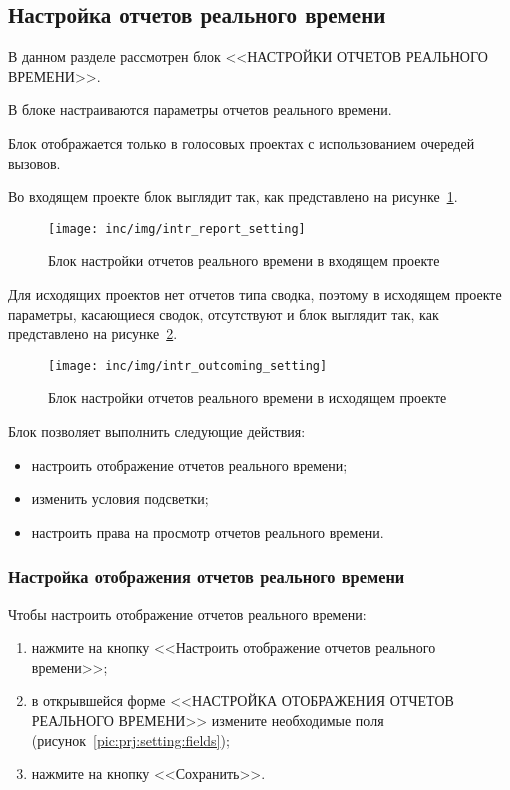 \subsection{Настройка отчетов реального времени}\label{subsec:настройка-отчетов-реального-времени}

В данном разделе рассмотрен блок <<НАСТРОЙКИ ОТЧЕТОВ РЕАЛЬНОГО ВРЕМЕНИ>>.

В блоке настраиваются параметры отчетов реального времени.

Блок отображается только в голосовых проектах с использованием очередей вызовов.

Во входящем проекте блок выглядит так, как представлено на рисунке~\ref{pic:incoming:setting}.

\begin{figure}[ht]
    \centering
    \texttt{[image: inc/img/intr\_report\_setting]}
    \caption{Блок настройки отчетов реального времени в входящем проекте}
    \label{pic:incoming:setting}
\end{figure}

Для исходящих проектов нет отчетов типа сводка, поэтому в исходящем проекте параметры,
касающиеся сводок, отсутствуют и блок выглядит так, как представлено на рисунке~\ref{pic:outcoming:setting}.

\begin{figure}[ht]
    \centering
    \texttt{[image: inc/img/intr\_outcoming\_setting]}
    \caption{Блок настройки отчетов реального времени в исходящем проекте}
    \label{pic:outcoming:setting}
\end{figure}

Блок позволяет выполнить следующие действия:
\begin{itemize}
    \item настроить отображение отчетов реального времени;
    \item изменить условия подсветки;
    \item настроить права на просмотр отчетов реального времени.
\end{itemize}

\subsubsection{Настройка отображения отчетов реального времени}

Чтобы настроить отображение отчетов реального времени:
\begin{enumerate}
    \item нажмите на кнопку <<Настроить отображение отчетов реального времени>>;
    \item в открывшейся форме <<НАСТРОЙКА ОТОБРАЖЕНИЯ ОТЧЕТОВ РЕАЛЬНОГО ВРЕМЕНИ>>
    измените необходимые поля (рисунок~\ref{pic:prj:setting:fields});
    \item нажмите на кнопку <<Сохранить>>.
\end{enumerate}

